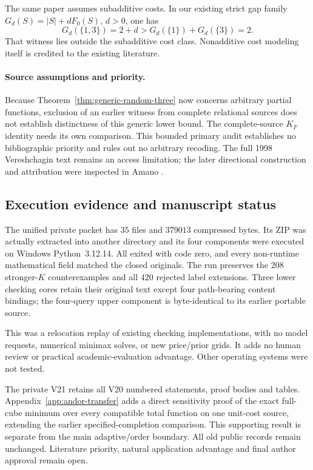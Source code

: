 \documentclass[pdflatex,sn-mathphys-num]{sn-jnl}
\theoremstyle{thmstyleone}
\theoremstyle{thmstylethree}
\theoremstyle{thmstyletwo}
\begin{document}
The same paper assumes subadditive costs. In our existing strict gap
family $G_d(S)=|S|+dF_0(S)$, $d>0$, one has
\[
 G_d(\{1,3\})=2+d>
 G_d(\{1\})+G_d(\{3\})=2.
\]
That witness lies outside the subadditive cost class. Nonadditive cost
modeling itself is credited to the existing literature.

\paragraph*{Source assumptions and priority.}
Because Theorem~\ref{thm:generic-random-three} now concerns arbitrary
partial functions, exclusion of an earlier witness from complete
relational sources does not establish distinctness of this generic
lower bound. The complete-source $K_F$ identity needs its own comparison.
This bounded primary audit establishes no bibliographic priority and
rules out no arbitrary recoding. The full 1998 Vereshchagin text remains
an access limitation; the later directional construction and attribution
were inspected in Amano \cite{amano2011directional}.

\subsection{Execution evidence and manuscript status}
\label{sec:generic-execution}
The unified private packet has $35$ files and $379013$ compressed bytes.
Its ZIP was actually extracted into another directory and its four
components were executed on Windows Python~3.12.14. All exited with
code zero, and every non-runtime mathematical field matched the closed
originals. The run preserves the $208$ stronger-$K$ counterexamples and
all $420$ rejected label extensions. Three lower checking cores retain
their original text except four path-bearing content bindings; the
four-query upper component is byte-identical to its earlier portable
source.

This was a relocation replay of existing checking implementations,
with no model requests, numerical minimax solves, or new price/prior
grids. It adds no human review or practical academic-evaluation advantage.
Other operating systems were not tested.

The private V21 retains all V20 numbered statements, proof bodies and
tables. Appendix~\ref{app:andor-transfer} adds a direct sensitivity proof of
the exact full-cube minimum over every compatible total function on one
unit-cost source, extending the earlier specified-completion comparison.
This supporting result is separate from the main adaptive/order boundary.
All old public records remain unchanged. Literature priority, natural
application advantage and final author approval remain open.
\end{document}
